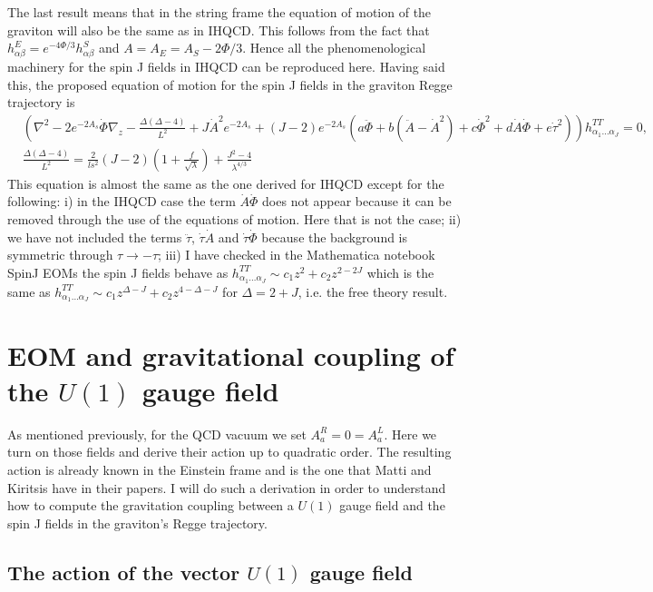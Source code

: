 \documentclass[10 pt]{article}
\begin{document}
The last result means that in the string frame the equation of motion of the graviton will also be the same as in IHQCD. This follows from the fact that $h^E_{\alpha \beta} = e^{- 4 \Phi / 3} h^S_{\alpha \beta}$ and $A = A_E = A_S - 2 \Phi / 3$. Hence all the phenomenological machinery for the spin J fields in IHQCD can be reproduced here. Having said this,
the proposed equation of motion for the spin J fields in the graviton Regge trajectory is
\begin{align}
&\left( \nabla^2 - 2 e^{-2A_s} \dot{\Phi} \nabla_z - \frac{\Delta ( \Delta - 4 )}{L^2} + J {\dot{A}}^2 e^{-2A_s} + \left( J - 2\right) e^{-2A_s} \left( a \ddot{\Phi} + b \left( \ddot{A} - {\dot{A}}^2 \right) + c {\dot{\Phi}}^2 + d \dot{A} \dot{\Phi} + e {\dot{\tau}}^2  \right)\right) h^{TT}_{\alpha_1 \dots \alpha_J} = 0, \\
&\frac{\Delta ( \Delta - 4 )}{L^2}  = \frac{2}{ls^2} \left(J - 2 \right) \left( 1 + \frac{f}{\sqrt{\lambda}} \right) + \frac{J^2 -4}{\lambda^{4/3}}
\end{align}
This equation is almost the same as the one derived for IHQCD except for the following: i) in the IHQCD case the term $\dot{A} \dot{\Phi}$ does not appear because it can be removed through the use of the equations of motion. Here that is not the case; ii) we have not included the terms $\ddot{\tau}$, $\dot{\tau} \dot{A}$ and $\dot{\tau} \dot{\Phi}$ because the background is symmetric through $\tau \rightarrow - \tau$; iii) I have checked in the Mathematica notebook SpinJ EOMs the spin J fields behave as $h^{TT}_{\alpha_1 \dots \alpha_J} \sim c_1 z^2 + c_2 z^{2-2 J}$ which is the same as  $h^{TT}_{\alpha_1 \dots \alpha_J} \sim c_1 z^{\Delta - J} + c_2 z^{4 - \Delta -J}$ for $\Delta = 2 + J$, i.e. the free theory result.

\section{EOM and gravitational coupling of the $U(1)$ gauge field}

As mentioned previously, for the QCD vacuum we set $A^R_a = 0 = A^L_a$. Here we turn on those fields and derive their action up to quadratic order. The resulting action is already known in the Einstein frame and is the one that Matti and Kiritsis have in their papers. I will do such a derivation in order to understand how to compute the gravitation coupling between a $U(1)$ gauge field and the spin J fields in the graviton's Regge trajectory.

\subsection{The action of the vector $U(1)$ gauge field}
\end{document}
